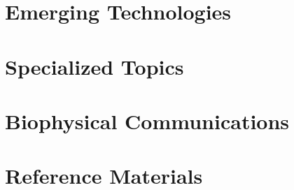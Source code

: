 \documentclass[11pt,twoside,openany]{book}
\begin{document}
\part{Emerging Technologies}

\part{Specialized Topics}

\part{Biophysical Communications}

\part{Reference Materials}

\appendix
\end{document}
